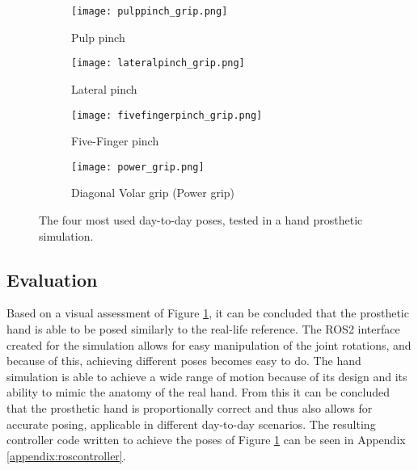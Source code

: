 \documentclass[../main.tex]{subfiles}
\begin{document}
\begin{figure}
    \centering
    \begin{subfigure}[b]{0.49\textwidth}
        \centering
        \texttt{[image: pulppinch\_grip.png]}
        \caption{Pulp pinch}
    \end{subfigure}
    \hfill
    \centering
    \begin{subfigure}[b]{0.49\textwidth}
        \centering
        \texttt{[image: lateralpinch\_grip.png]}
        \caption{Lateral pinch}
    \end{subfigure}
    \hfill
    \begin{subfigure}[b]{0.49\textwidth}
        \centering
        \texttt{[image: fivefingerpinch\_grip.png]}
        \caption{Five-Finger pinch}
    \end{subfigure}
    \hfill
    \begin{subfigure}[b]{0.49\textwidth}
        \centering
        \texttt{[image: power\_grip.png]}
        \caption{Diagonal Volar grip (Power grip)}
    \end{subfigure}
    \caption{The four most used day-to-day poses, tested in a hand prosthetic simulation.}
    \label{fig:hand_pose_test}
\end{figure}


\subsection{Evaluation}

Based on a visual assessment of Figure \ref{fig:hand_pose_test}, it can be concluded that the prosthetic hand is able to be posed similarly to the real-life reference.
The ROS2 interface created for the simulation allows for easy manipulation of the joint rotations, and because of this, achieving different poses becomes easy to do.
The hand simulation is able to achieve a wide range of motion because of its design and its ability to mimic the anatomy of the real hand.
From this it can be concluded that the prosthetic hand is proportionally correct and thus also allows for accurate posing, applicable in different day-to-day scenarios.
The resulting controller code written to achieve the poses of Figure \ref{fig:hand_pose_test} can be seen in Appendix \ref{appendix:roscontroller}.


%
\end{document}
